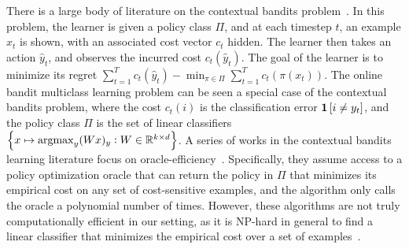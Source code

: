 

There is a large body of literature on the contextual bandits
problem~\citep{Auer-2003, Langford-Zhang-2008}. In this problem, the learner is
given a policy class $\Pi$, and at each timestep $t$, an example $x_t$ is shown,
with an associated cost vector $c_t$ hidden. The learner then takes an action
$\widehat{y}_t$, and observes the incurred cost $c_t(\widehat{y}_t)$. The goal
of the learner is to minimize its regret $\sum_{t=1}^T c_t(\widehat{y}_t) -
\min_{\pi \in \Pi} \sum_{t=1}^T c_t(\pi(x_t))$. The online bandit multiclass
learning problem can be seen a special case of the contextual bandits problem, where the
cost $c_t(i)$ is the classification error $\mathbf{1}\left[i \neq y_t \right]$, and the
policy class $\Pi$ is the set of linear classifiers $\cbr{x \mapsto \argmax_y
(Wx)_y: W \in \R^{k \times d}}$. A series of works in the contextual bandits
learning literature focus on
oracle-efficiency~\citep{Dudik-Hsu-Kale-Karampatziakis-Langford-Reyzin-Zhang-2011,
Agarwal-Hsu-Kale-Langford-Li-Schapire-2014, Rakhlin-Sridharan-2016,
Syrgkanis-Krishnamurthy-Schapire-2016,
Syrgkanis-Luo-Krishnamurthy-Schapire-2016}. Specifically, they assume access to
a policy optimization oracle that can return the policy in $\Pi$ that minimizes
its empirical cost on any set of cost-sensitive examples, and the algorithm only
calls the oracle a polynomial number of times. However, these algorithms are not
truly computationally efficient in our setting, as it is NP-hard in general to
find a linear classifier that minimizes the empirical cost over a set of
examples~\citep{Arora-Babai-Stern-Sweedyk-1997}.

